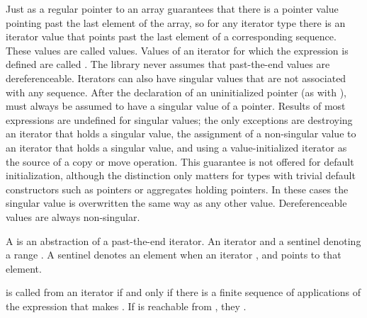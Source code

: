 \pnum
Just as a regular pointer to an array guarantees that there is a pointer value pointing past the last element
of the array, so for any iterator type there is an iterator value that points past the last element of a
corresponding sequence.
These values are called
values.
Values of an iterator
for which the expression
is defined are called
.
The library never assumes that past-the-end values are dereferenceable.
Iterators can also have singular values that are not associated with any
sequence.
\enterexample
After the declaration of an uninitialized pointer
(as with
),
must always be assumed to have a singular value of a pointer.
\exitexample
Results of most expressions are undefined for singular values;
the only exceptions are destroying an iterator that holds a singular value,
the assignment of a non-singular value to
an iterator that holds a singular value, and using a value-initialized iterator
as the source of a copy or move operation. \enternote This guarantee is not
offered for default initialization, although the distinction only matters for types
with trivial default constructors such as pointers or aggregates holding pointers.
\exitnote
In these cases the singular
value is overwritten the same way as any other value.
Dereferenceable
values are always non-singular.

\begin{addedblock}
\pnum
A
is an abstraction of a past-the-end iterator. An iterator and a sentinel denoting a range
.
A sentinel denotes an element when
an iterator , and
 points to that element. 
\end{addedblock}

\pnum
{}
is called
from an iterator
if and only if there is a finite sequence of applications of
the expression
that makes
.
If
is reachable from
,
they .


